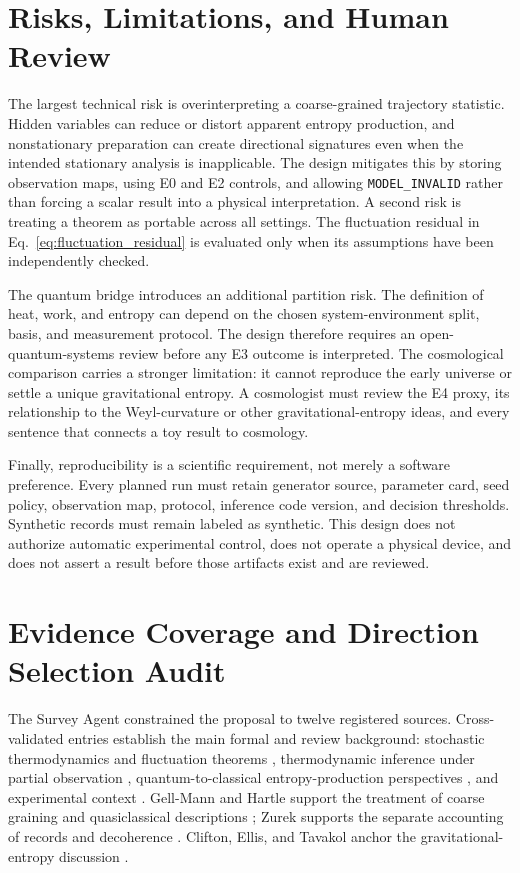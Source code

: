 \section{Risks, Limitations, and Human Review}

The largest technical risk is overinterpreting a coarse-grained trajectory statistic. Hidden variables can reduce or distort apparent entropy production, and nonstationary preparation can create directional signatures even when the intended stationary analysis is inapplicable. The design mitigates this by storing observation maps, using E0 and E2 controls, and allowing \texttt{MODEL\_INVALID} rather than forcing a scalar result into a physical interpretation. A second risk is treating a theorem as portable across all settings. The fluctuation residual in Eq.~\eqref{eq:fluctuation_residual} is evaluated only when its assumptions have been independently checked.

The quantum bridge introduces an additional partition risk. The definition of heat, work, and entropy can depend on the chosen system-environment split, basis, and measurement protocol. The design therefore requires an open-quantum-systems review before any E3 outcome is interpreted. The cosmological comparison carries a stronger limitation: it cannot reproduce the early universe or settle a unique gravitational entropy. A cosmologist must review the E4 proxy, its relationship to the Weyl-curvature or other gravitational-entropy ideas, and every sentence that connects a toy result to cosmology.

Finally, reproducibility is a scientific requirement, not merely a software preference. Every planned run must retain generator source, parameter card, seed policy, observation map, protocol, inference code version, and decision thresholds. Synthetic records must remain labeled as synthetic. This design does not authorize automatic experimental control, does not operate a physical device, and does not assert a result before those artifacts exist and are reviewed.

\appendices
\section{Evidence Coverage and Direction Selection Audit}

The Survey Agent constrained the proposal to twelve registered sources. Cross-validated entries establish the main formal and review background: stochastic thermodynamics and fluctuation theorems \cite{seifert2012}, thermodynamic inference under partial observation \cite{seifert2018}, quantum-to-classical entropy-production perspectives \cite{landi2021}, and experimental context \cite{ciliberto2017}. Gell-Mann and Hartle support the treatment of coarse graining and quasiclassical descriptions \cite{gellmann_hartle2007}; Zurek supports the separate accounting of records and decoherence \cite{zurek1993}. Clifton, Ellis, and Tavakol anchor the gravitational-entropy discussion \cite{clifton_ellis_tavakol2013}.

